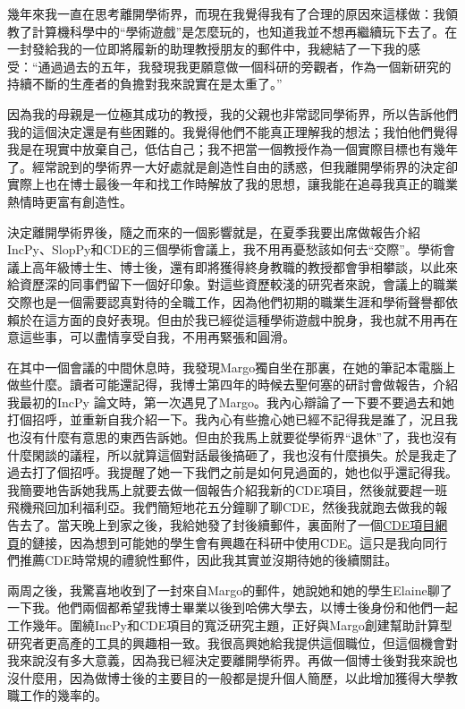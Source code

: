 \documentclass[12pt,UTF8,nofonts]{book}
\begin{document}
幾年來我一直在思考離開學術界，而現在我覺得我有了合理的原因來這樣做：我領教了計算機科學中的“學術遊戲”是怎麼玩的，也知道我並不想再繼續玩下去了。在一封發給我的一位即將履新的助理教授朋友的郵件中，我總結了一下我的感受：“通過過去的五年，我發現我更願意做一個科研的旁觀者，作為一個新研究的持續不斷的生產者的負擔對我來說實在是太重了。”

因為我的母親是一位極其成功的教授，我的父親也非常認同學術界，所以告訴他們我的這個決定還是有些困難的。我覺得他們不能真正理解我的想法；我怕他們覺得我是在現實中放棄自己，低估自己；我不把當一個教授作為一個實際目標也有幾年了。經常說到的學術界一大好處就是創造性自由的誘惑，但我離開學術界的決定卻實際上也在博士最後一年和找工作時解放了我的思想，讓我能在追尋我真正的職業熱情時更富有創造性。

\breakline

決定離開學術界後，隨之而來的一個影響就是，在夏季我要出席做報告介紹IncPy、SlopPy和CDE的三個學術會議上，我不用再憂愁該如何去“交際”。學術會議上高年級博士生、博士後，還有即將獲得終身教職的教授都會爭相攀談，以此來給資歷深的同事們留下一個好印象。對這些資歷較淺的研究者來說，會議上的職業交際也是一個需要認真對待的全職工作，因為他們初期的職業生涯和學術聲譽都依賴於在這方面的良好表現。但由於我已經從這種學術遊戲中脫身，我也就不用再在意這些事，可以盡情享受自我，不用再緊張和圓滑。

在其中一個會議的中間休息時，我發現Margo獨自坐在那裏，在她的筆記本電腦上做些什麼。讀者可能還記得，我博士第四年的時候去聖何塞的研討會做報告，介紹我最初的IncPy 論文時，第一次遇見了Margo。我內心辯論了一下要不要過去和她打個招呼，並重新自我介紹一下。我內心有些擔心她已經不記得我是誰了，況且我也沒有什麼有意思的東西告訴她。但由於我馬上就要從學術界“退休”了，我也沒有什麼閑談的議程，所以就算這個對話最後搞砸了，我也沒有什麼損失。於是我走了過去打了個招呼。我提醒了她一下我們之前是如何見過面的，她也似乎還記得我。我簡要地告訴她我馬上就要去做一個報告介紹我新的CDE項目，然後就要趕一班飛機飛回加利福利亞。我們簡短地花五分鐘聊了聊CDE，然後我就跑去做我的報告去了。當天晚上到家之後，我給她發了封後續郵件，裏面附了一個\href{http://www.pgbovine.net/cde.html}{CDE項目網頁}的鏈接，因為想到可能她的學生會有興趣在科研中使用CDE。這只是我向同行們推薦CDE時常規的禮貌性郵件，因此我其實並沒期待她的後續關註。

兩周之後，我驚喜地收到了一封來自Margo的郵件，她說她和她的學生Elaine聊了一下我。他們兩個都希望我博士畢業以後到哈佛大學去，以博士後身份和他們一起工作幾年。圍繞IncPy和CDE項目的寬泛研究主題，正好與Margo創建幫助計算型研究者更高產的工具的興趣相一致。我很高興她給我提供這個職位，但這個機會對我來說沒有多大意義，因為我已經決定要離開學術界。再做一個博士後對我來說也沒什麼用，因為做博士後的主要目的一般都是提升個人簡歷，以此增加獲得大學教職工作的幾率的。
\end{document}
